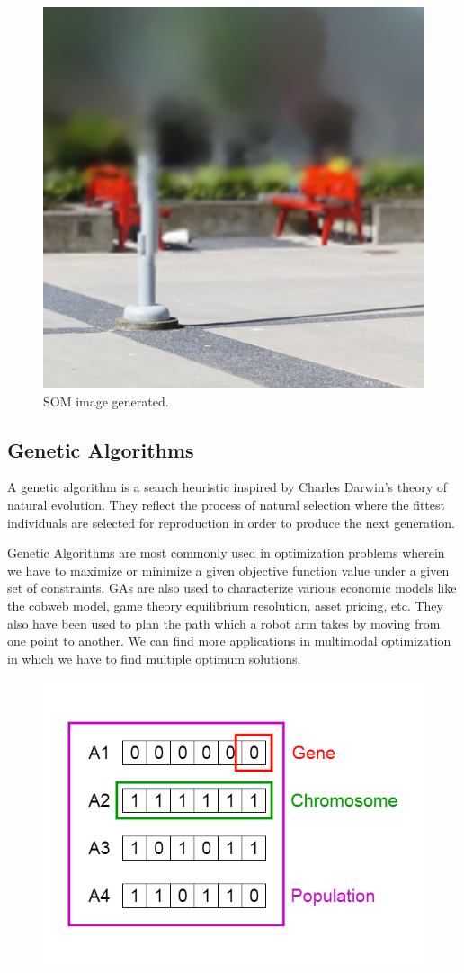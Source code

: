 \documentclass[11pt,letterpaper]{report}
\begin{document}
\begin{figure}[h!]
	\centering
	\includegraphics[width=0.45\linewidth]{figures/ex.jpg}
	\caption{SOM image generated.} 
	\label{fig:som}
\end{figure} 	

\subsection{Genetic Algorithms}
A genetic algorithm is a search heuristic  inspired by Charles Darwin’s theory of natural evolution. They reflect the process of natural selection where the fittest individuals are selected for reproduction in order to produce the next generation.



Genetic Algorithms are most commonly used in optimization problems wherein we have to maximize or minimize a given objective function value under a given set of constraints. GAs are also used to characterize various economic models like the cobweb model, game theory equilibrium resolution, asset pricing, etc. They also have been used to plan the path which a robot arm takes by moving from one point to another. We can find more applications in multimodal optimization in which we have to find multiple optimum solutions.



\begin{figure}[h!]
	\centering
	\includegraphics[width=0.45\linewidth]{figures/GAfigure1.png}
	\caption{}
	\label{fig:GA}
\end{figure} 	
\end{document}
